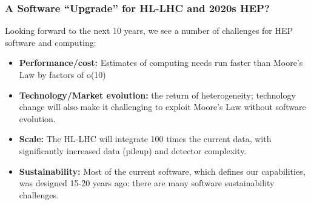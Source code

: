 \begin{frame}
\frametitle{A Software ``Upgrade'' for HL-LHC and 2020s HEP?}

Looking forward to the next 10 years, we see a number of challenges for HEP software and computing:

\begin{itemize}
\item {\bf Performance/cost:} Estimates of computing needs run faster than Moore's Law by factors of o(10)
\item {\bf Technology/Market evolution:} the return of heterogeneity; technology change will also make it challenging to exploit Moore's Law without software evolution.
\item {\bf Scale:} The HL-LHC will integrate 100 times the current data, with significantly increased data (pileup) and detector complexity.
\item {\bf Sustainability:} Most of the current software, which defines our capabilities, was designed 15-20 years ago: there are many software sustainability challenges.
\end{itemize}

\end{frame}


